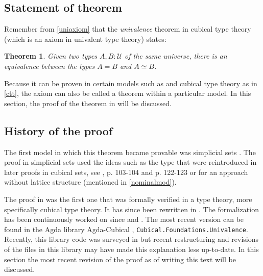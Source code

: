 \documentclass[12pt,a4paper,twoside,xetex]{book}
\newcommand{\keyword}[1]{\emph{#1}\index{#1}}
\newtheorem{theorem}{Theorem}[section]
\begin{document}
\subsection{Statement of theorem}

Remember from \cref{uniaxiom} that the \keyword{univalence} theorem in cubical 
type theory (which is an axiom in univalent type theory) states:

\begin{theorem}
 Given two types $A, B : \mathcal{U}$ of the same universe, there is an 
equivalence between the types $A = B$ and $A \simeq B$.
 \end{theorem}

Because it can be proven in certain models such as \cite{Kapulkin2012} and 
cubical type theory as in \cref{ctt}, the axiom can also be called a theorem 
within a particular model. In this section, the proof of the theorem in 
\cite{Moertberg2018} will be discussed.

\subsection{History of the proof}

The first model in which this theorem became provable was simplicial sets 
\cite{Kapulkin2012}. The proof in simplicial sets used the ideas such as the 
 type that were reintroduced in later proofs in cubical sets, see 
\cite{Huber2016}, p. 103-104 and p. 122-123 or \cite{Bezem2018} for an approach 
without lattice structure (mentioned in \cref{nominalmod}). 

The proof in \cite{Huber2016} was the first one that was formally verified in a 
type theory, more specifically cubical type theory. It has since been rewritten 
in \cite{Weinberger2016}. The formalization has been continuously worked on 
since \cite{Moertberg2015} and \cite{Cohen2016}. The most recent version can be 
found in the Agda library Agda-Cubical  \cite{Moertberg2018}, 
\texttt{Cubical.Foundations.Univalence}. Recently, this library code was 
surveyed in \cite{Moertberg2018a} but recent restructuring and revisions of the 
files in this library may have made this explanation less up-to-date. In this 
section the most recent revision of the proof as of writing this 
text will be discussed.
\end{document}
